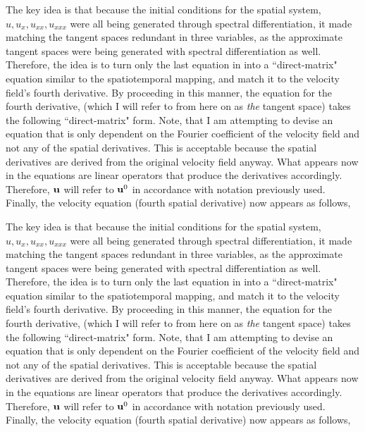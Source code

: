 The key idea is that because the initial conditions for the spatial system,
$u, u_{x}, u_{x x}, u_{x x x}$ were all being generated
through spectral differentiation, it made matching the tangent spaces redundant in
three variables, as the approximate tangent spaces were being generated with spectral
differentiation as well. Therefore, the idea is to turn only the last equation in
 into a ``direct-matrix"  equation similar to the spatiotemporal mapping,
and match it to the velocity field's fourth derivative.
By proceeding in this manner, the equation for the fourth derivative, (which I will
refer to from here on as \emph{the} tangent space) takes the following ``direct-matrix" form.
Note, that I am attempting to devise an equation that is only dependent on the Fourier coefficient of the
velocity field and not any of the spatial derivatives. This is acceptable because the spatial derivatives
are derived from the original velocity field anyway. What appears now in the equations are linear operators
that produce the derivatives accordingly. Therefore, $\mathbf{u}$ will refer to $\mathbf{u}^{0}$ in accordance with
notation previously used. Finally, the velocity equation (fourth spatial derivative) now appears as follows,

The key idea is that because the initial conditions for the spatial system,
$u, u_{x}, u_{x x}, u_{x x x}$ were all being generated
through spectral differentiation, it made matching the tangent spaces redundant in
three variables, as the approximate tangent spaces were being generated with spectral
differentiation as well. Therefore, the idea is to turn only the last equation in
 into a ``direct-matrix"  equation similar to the spatiotemporal mapping,
and match it to the velocity field's fourth derivative.
By proceeding in this manner, the equation for the fourth derivative, (which I will
refer to from here on as \emph{the} tangent space) takes the following ``direct-matrix" form.
Note, that I am attempting to devise an equation that is only dependent on the Fourier coefficient of the
velocity field and not any of the spatial derivatives. This is acceptable because the spatial derivatives
are derived from the original velocity field anyway. What appears now in the equations are linear operators
that produce the derivatives accordingly. Therefore, $\mathbf{u}$ will refer to $\mathbf{u}^{0}$ in accordance with
notation previously used. Finally, the velocity equation (fourth spatial derivative) now appears as follows,

